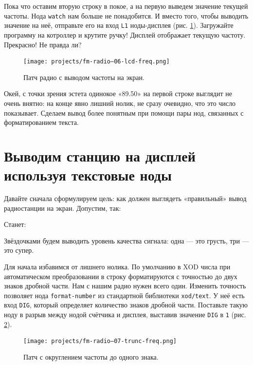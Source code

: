Пока что оставим вторую строку в покое, а на первую выведем значение текущей частоты. Нода \texttt{watch} нам больше не понадобится. И вместо того, чтобы выводить значение на неё, отправьте его на вход \texttt{L1} ноды-дисплея (рис. \ref{patch:lcd-freq}). Загружайте программу на котроллер и крутите ручку! Дисплей отображает текущую частоту. Прекрасно! Не правда ли?

\begin{figure}
  \centering
  \texttt{[image: projects/fm-radio--06-lcd-freq.png]}
  \caption{Патч радио с выводом частоты на экран.}
  \label{patch:lcd-freq}
\end{figure}

Окей, с точки зрения эстета одинокое «89.50» на первой строке выглядит не очень внятно: на конце явно лишний нолик, не сразу очевидно, что это число показывает. Сделаем вывод более понятным при помощи пары нод, связанных с форматированием текста.

\section{Выводим станцию на дисплей используя текстовые ноды}

Давайте сначала сформулируем цель: как должен выглядеть «правильный» вывод радиостанции на экран. Допустим, так:

\begin{labeling}{Станет:}
  \item [Было:] 
  \item [Станет:] 
\end{labeling}

Звёздочками будем выводить уровень качества сигнала: одна — это грусть, три — это супер.

Для начала избавимся от лишнего нолика. По умолчанию в XOD числа при автоматическом преобразовании в строку форматируются с точностью до двух знаков дробной части. Нам с нашим радио нужен всего один. Изменить точность позволяет нода \texttt{format-number} из стандартной библиотеки \texttt{xod/text}. У неё есть вход \texttt{DIG}, который определяет количество знаков дробной части. Поставьте такую ноду в разрыв между нодой счётчика и дисплея, выставив значение \texttt{DIG} в \texttt{1} (рис. \ref{patch:fm-format-number}).

\begin{figure}
  \centering
  \texttt{[image: projects/fm-radio--07-trunc-freq.png]}
  \caption{Патч с округлением частоты до одного знака.}
  \label{patch:fm-format-number}
\end{figure}

